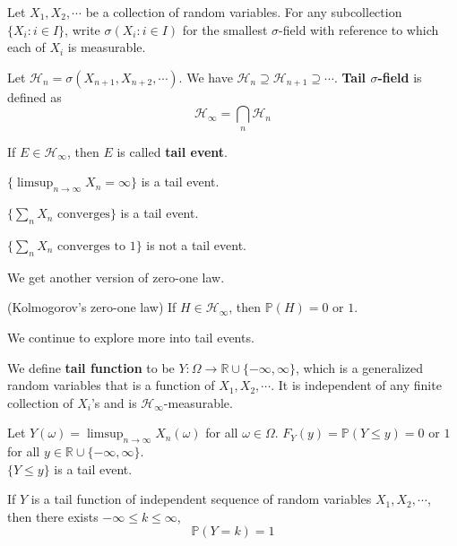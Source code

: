 \documentclass{huhtakm-template-book}
\newcommand{\prob}{\mathbb{P}}
\begin{document}
\newpage
Let $X_{1},X_{2},\cdots$ be a collection of random variables. For any subcollection $\{X_{i}:i\in I\}$, write $\sigma(X_{i}:i\in I)$ for the smallest $\sigma$-field with reference to which each of $X_{i}$ is measurable.
\begin{defn}
    Let $\mathcal{H}_{n}=\sigma(X_{n+1},X_{n+2},\cdots)$. We have $\mathcal{H}_{n}\supseteq\mathcal{H}_{n+1}\supseteq\cdots$. \textbf{Tail $\sigma$-field} is defined as
    \begin{equation*}
        \mathcal{H}_{\infty}=\bigcap_{n}\mathcal{H}_{n}
    \end{equation*}
\end{defn}
\begin{rem}
    If $E\in\mathcal{H}_{\infty}$, then $E$ is called \textbf{tail event}.
\end{rem}
\begin{eg}
    $\{\limsup_{n\to\infty}X_{n}=\infty\}$ is a tail event.
\end{eg}
\begin{eg}
    $\{\sum_{n}X_{n}\text{ converges}\}$ is a tail event.
\end{eg}
\begin{eg}
    $\{\sum_{n}X_{n}\text{ converges to }1\}$ is not a tail event.
\end{eg}
We get another version of zero-one law.
\begin{thm}(Kolmogorov's zero-one law)
    If $H\in\mathcal{H}_{\infty}$, then $\prob(H)=0$ or $1$.
\end{thm}
We continue to explore more into tail events.
\begin{defn}
    We define \textbf{tail function} to be $Y:\Omega\to\mathbb{R}\cup\{-\infty,\infty\}$, which is a generalized random variables that is a function of $X_{1},X_{2},\cdots$. It is independent of any finite collection of $X_{i}$'s and is $\mathcal{H}_{\infty}$-measurable.
\end{defn}
\begin{eg}
    Let $Y(\omega)=\limsup_{n\to\infty}X_{n}(\omega)$ for all $\omega\in\Omega$. $F_{Y}(y)=\prob(Y\leq y)=0$ or $1$ for all $y\in\mathbb{R}\cup\{-\infty,\infty\}$.\\
    $\{Y\leq y\}$ is a tail event.
\end{eg}
\begin{thm}
    If $Y$ is a tail function of independent sequence of random variables $X_{1},X_{2},\cdots$, then there exists $-\infty\leq k\leq\infty$,
    \begin{equation*}
        \prob(Y=k)=1
    \end{equation*}
\end{thm}
\end{document}
